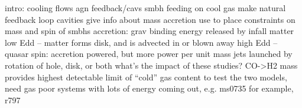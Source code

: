 \documentclass[11pt]{article}
\begin{document}





\frontpage






\techsheetPV


\maketitle




intro:
  cooling flows
  agn feedback/cavs
  smbh feeding on cool gas make natural feedback loop
  cavities give info about mass accretion
  use to place constraints on mass and spin of smbhs
  accretion:
    grav binding energy released by infall matter
    low Edd -- matter forms disk, and is advected in or blown away
    high Edd -- quasar
  spin:
    accretion powered, but more power per unit mass
    jets launched by rotation of hole, disk, or both
  what's the impact of these studies?
  CO->H2 mass provides highest detectable limit of ``cold'' gas content
  to test the two models, need gas poor systems with lots of energy coming out, e.g. ms0735
  for example, r797
\end{document}
